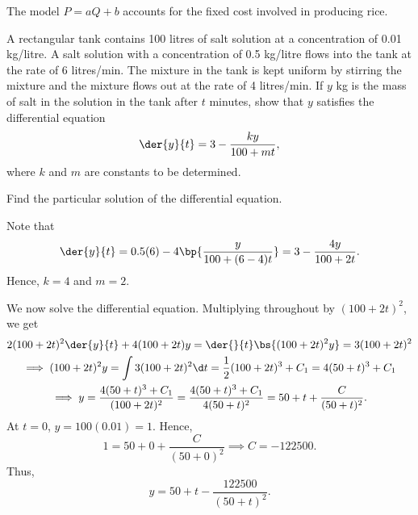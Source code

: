 \begin{solution}
\begin{ppart}
\begin{center}
        \end{center}
    \end{ppart}

    The model $P = aQ + b$ accounts for the fixed cost involved in producing rice.
\end{solution}

\begin{problem}
    A rectangular tank contains 100 litres of salt solution at a concentration of 0.01 kg/litre. A salt solution with a concentration of 0.5 kg/litre flows into the tank at the rate of 6 litres/min. The mixture in the tank is kept uniform by stirring the mixture and the mixture flows out at the rate of 4 litres/min. If $y$ kg is the mass of salt in the solution in the tank after $t$ minutes, show that $y$ satisfies the differential equation \[\der{y}{t} = 3 - \frac{ky}{100 + mt},\] where $k$ and $m$ are constants to be determined.

    Find the particular solution of the differential equation.
\end{problem}
\begin{solution}
    Note that \[\der{y}{t} = 0.5(6) - 4\bp{\frac{y}{100 + (6-4)t}} = 3 - \frac{4y}{100 + 2t}.\] Hence, $k = 4$ and $m = 2$.

    We now solve the differential equation. Multiplying throughout by $(100 + 2t)^2$, we get
    \begin{gather*}{2}
        (100+2t)^2 \der{y}{t} + 4(100+2t)y = \der{}{t} \bs{(100+2t)^2 y} = 3(100 + 2t)^2\\
        \implies (100+2t)^2 y = \int 3 (100+2t)^2 \d t = \frac12 (100 + 2t)^3 + C_1 = 4(50 + t)^3 + C_1\\
        \implies y = \frac{4(50+t)^3 + C_1}{(100+2t)^2} = \frac{4(50+t)^3 + C_1}{4(50 + t)^2} = 50 + t + \frac{C}{(50 + t)^2}.
    \end{gather*}
    At $t = 0$, $y = 100(0.01) = 1$. Hence, \[1 = 50 + 0 + \frac{C}{(50+0)^2} \implies C = -122500.\] Thus, \[y = 50 + t - \frac{122500}{(50+t)^2}.\]
\end{solution}

